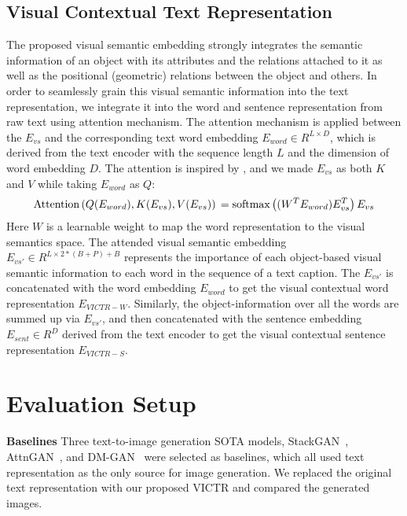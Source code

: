 \documentclass[11pt]{article}
\begin{document}
\subsection{Visual Contextual Text Representation}
The proposed visual semantic embedding strongly integrates the semantic information of an object with its attributes and the relations attached to it as well as the positional (geometric) relations between the object and others. In order to seamlessly grain this visual semantic information into the text representation, we integrate it into the word and sentence representation from raw text using attention mechanism. The attention mechanism is applied between the $E_{vs}$ and the corresponding text word embedding $E_{word}\in R^{L\times D}$, which is derived from the text encoder with the sequence length $L$ and the dimension of word embedding $D$. The attention is inspired by \cite{vaswani2017attention}, and we made $E_{vs}$ as both $K$ and $V$ while taking $E_{word}$ as $Q$:
\begin{equation}
\textup{Attention}\left ( Q(E_{word}), K(E_{vs}), V(E_{vs}) \right ) \\= 
    \textup{softmax}\left (  (W^{T}E_{word})E_{vs}^{T} \right )E_{vs}
\end{equation}
Here $W$ is a learnable weight to map the word representation to the visual semantics space. The attended visual semantic embedding $E_{vs'}\in R^{L\times 2\ast \left ( B+P \right )+B}$ represents the importance of each object-based visual semantic information to each word in the sequence of a text caption. The $E_{vs'}$ is concatenated with the word embedding $E_{word}$ to get the visual contextual word representation $E_{VICTR-W}$. Similarly, the object-information over all the words are summed up via $E_{vs'}$, and then concatenated with the sentence embedding $E_{sent} \in R^{D}$ derived from the text encoder to get the visual contextual sentence representation $E_{VICTR-S}$.


\section{Evaluation Setup}
\textbf{Baselines}
Three text-to-image generation SOTA models, StackGAN~\cite{zhang2017stackgan}, AttnGAN~\cite{xu2018attngan}, and DM-GAN~\cite{zhu2019dm} were selected as baselines, which all used text representation as the only source for image generation. We replaced the original text representation with our proposed VICTR and compared the generated images.
\end{document}
